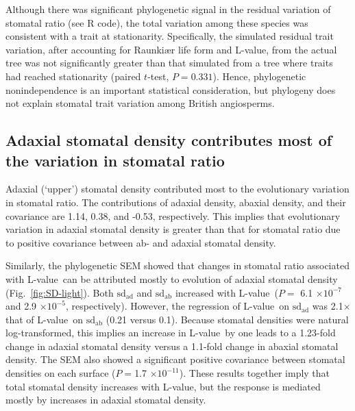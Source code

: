 \documentclass[12pt, oneside]{article}
\newcommand{\el}{L-value}
\begin{document}
Although there was significant phylogenetic signal in the residual variation of stomatal ratio (see R code), the total variation among these species was consistent with a trait at stationarity. Specifically, the simulated residual trait variation, after accounting for Raunki\ae r life form and \el, from the actual tree was not significantly greater than that simulated from a tree where traits had reached stationarity (paired $t$-test, $P = 0.331$). Hence, phylogenetic nonindependence is an important statistical consideration, but phylogeny does not explain stomatal trait variation among British angiosperms.

\subsection*{Adaxial stomatal density contributes most of the variation in stomatal ratio}

Adaxial (`upper') stomatal density contributed most to the evolutionary variation in stomatal ratio. The contributions of adaxial density, abaxial density, and their covariance are 1.14, 0.38, and -0.53, respectively. This implies that evolutionary variation in adaxial stomatal density is greater than that for stomatal ratio due to positive covariance between ab- and adaxial stomatal density.

Similarly, the phylogenetic SEM showed that changes in stomatal ratio associated with \el~can be attributed mostly to evolution of adaxial stomatal density (Fig.~\ref{fig:SD-light}). Both $\mathrm{sd_{ad}}$ and $\mathrm{sd_{ab}}$ increased with \el~($P =$ 6.1 $\times10^{-7}$ and 2.9 $\times10^{-5}$, respectively). However, the regression of \el~on $\mathrm{sd_{ad}}$ was 2.1$\times$ that of \el~on $\mathrm{sd_{ab}}$ (0.21 versus 0.1). Because stomatal densities were natural log-transformed, this implies an increase in \el~by one leads to a 1.23-fold change in adaxial stomatal density versus a 1.1-fold change in abaxial stomatal density. The SEM also showed a significant positive covariance between stomatal densities on each surface ($P = $1.7 $\times10^{-11}$). These results together imply that total stomatal density increases with \el, but the response is mediated mostly by increases in adaxial stomatal density.


\end{document}
